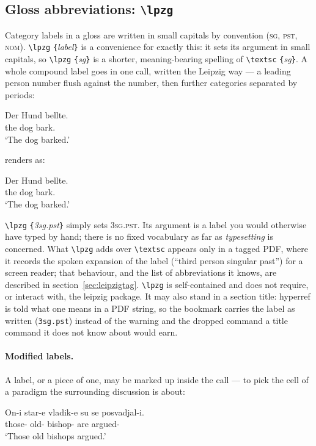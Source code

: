 \documentclass[11pt,a4paper]{article}
\newcommand{\cs}[1]{\texttt{\textbackslash #1}}
\newcommand{\pkg}[2][]{\textsf{#2}}
\newcommand{\meta}[1]{\textrm{\itshape\textlangle#1\textrangle}}
\newcommand{\marg}[1]{\penalty300 \texttt{\{}\meta{#1}\texttt{\}}}
\newcommand{\rendered}{\par\medskip\noindent\textcolor{gray!70}{\small renders as:}\par\nobreak\smallskip}
\newcommand{\afterex}{\par\addvspace{\medskipamount}}
\begin{document}
\subsection{Gloss abbreviations: \cs{lpzg}}\label{sec:leipzig}
Category labels in a gloss are written in small capitals by convention
(\textsc{sg}, \textsc{pst}, \textsc{nom}). \cs{lpzg}\marg{label} is a
convenience for exactly this: it sets its argument in small capitals, so
\cs{lpzg}\marg{sg} is a shorter, meaning-bearing spelling of
\cs{textsc}\marg{sg}. A whole compound label goes in one call, written the
Leipzig way --- a leading person number flush against the number, then
further categories separated by periods:

\begin{code}
\gll Der Hund bellte.\\
     the dog  bark.\\
\glt `The dog barked.'
\end{code}

\rendered
\gll Der Hund bellte.\\
     the dog bark.\\
\glt `The dog barked.'

\afterex
\noindent \cs{lpzg}\marg{3sg.pst} simply sets \textsc{3sg.pst}. Its
argument is a label you would otherwise have typed by hand; there is no
fixed vocabulary as far as \emph{typesetting} is concerned. What
\cs{lpzg} adds over \cs{textsc} appears only in a tagged PDF, where it
records the spoken expansion of the label (``third person singular past'')
for a screen reader; that behaviour, and the list of abbreviations it
knows, are described in section~\ref{sec:leipzigtag}. \cs{lpzg} is
self-contained and does not require, or interact with, the \pkg{leipzig}
package. It may also stand in a section title: \pkg{hyperref} is told what
one means in a PDF string, so the bookmark carries the label as written
(\texttt{3sg.pst}) instead of the warning and the dropped command a title
command it does not know about would earn.

\paragraph{Modified labels.} A label, or a piece of one, may be marked up
inside the call --- to pick the cell of a paradigm the surrounding
discussion is about:

\begin{code}
\gll On-i star-e vladik-e su se posvadjal-i.\\
     those- old- bishop-
       are  argued-\\
\glt `Those old bishops argued.'
\end{code}
\end{document}
